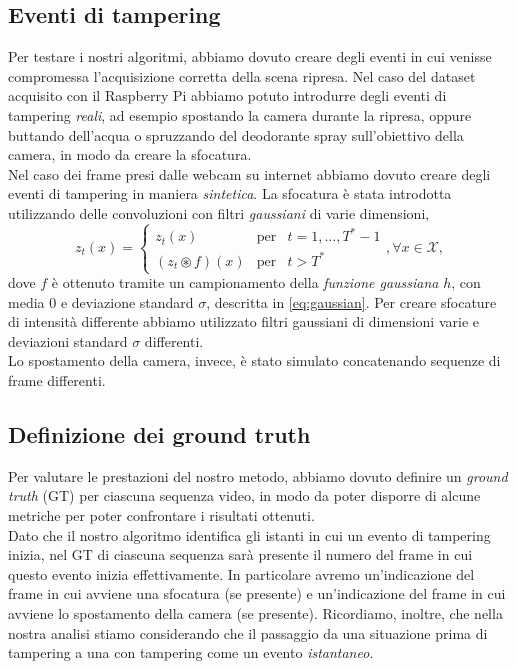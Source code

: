 \subsection{Eventi di tampering}
\label{tamperingSint}
Per testare i nostri algoritmi, abbiamo dovuto creare degli eventi in cui venisse compromessa l'acquisizione corretta della scena ripresa.
Nel caso del dataset acquisito con il Raspberry Pi abbiamo potuto introdurre degli eventi di tampering \textit{reali}, ad esempio spostando la camera durante la ripresa, oppure buttando dell'acqua o spruzzando del deodorante spray sull'obiettivo della camera, in modo da creare la sfocatura.\\
Nel caso dei frame presi dalle webcam su internet abbiamo dovuto creare degli eventi di tampering in maniera \textit{sintetica}.
La sfocatura \`e stata introdotta utilizzando delle convoluzioni con filtri \textit{gaussiani} di varie dimensioni,
\begin{equation}
\label{eq:blurArtificiale}
z_t(x) = \left\{ \begin{array}{ccl}
z_t(x) & \mbox{per} & t=1,\dots,T^* -1 \\
(z_t \circledast f)(x) & \mbox{per} & t > T^* 
\end{array}\right. , \forall x \in \mathcal{X},
\end{equation}
dove $f$ \`e ottenuto tramite un campionamento della \textit{funzione gaussiana} $h$, con media $0$ e deviazione standard $\sigma$, descritta in \eqref{eq:gaussian}.
Per creare sfocature di intensit\`a differente abbiamo utilizzato filtri gaussiani di dimensioni varie e deviazioni standard $\sigma$ differenti.\\
Lo spostamento della camera, invece, \`e stato simulato concatenando sequenze di frame differenti.
\subsection{Definizione dei ground truth}
Per valutare le prestazioni del nostro metodo, abbiamo dovuto definire un \textit{ground truth} (GT) per ciascuna sequenza video, in modo da poter disporre di alcune metriche per poter confrontare i risultati ottenuti.\\
Dato che il nostro algoritmo identifica gli istanti in cui un evento di tampering inizia, nel GT di ciascuna sequenza sar\`a presente il numero del frame in cui questo evento inizia effettivamente. 
In particolare avremo un'indicazione del frame in cui avviene una sfocatura (se presente) e un'indicazione del frame in cui avviene lo spostamento della camera (se presente).
Ricordiamo, inoltre, che nella nostra analisi stiamo considerando che il passaggio da una situazione prima di tampering a una con tampering come un evento \textit{istantaneo}. 
